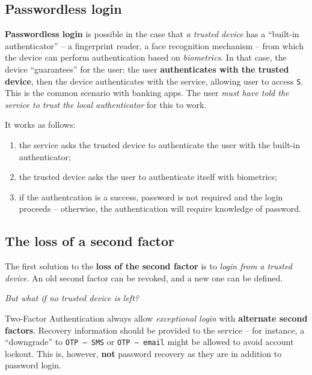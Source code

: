 \documentclass[10pt]{extbook}
\begin{document}
\subsection{Passwordless login}

\textbf{Passwordless login} is possible in the case that \emph{a trusted
device} has a ``built\--in authenticator'' -- a fingerprint reader, a face
recognition mechanism -- from which the device can perform authentication based
on \emph{biometrics}. In that case, the device ``guarantees'' for the user: the
user \textbf{authenticates with the trusted device}, then the device
authenticates with the service, allowing user to access \texttt{S}. This is the
common scenario with banking apps. The user \emph{must have told the service to
trust the local authenticator} for this to work.

It works as follows:
\begin{enumerate}
    \item the service asks the trusted device to authenticate the user with the
        built\--in authenticator;
    \item the trusted device asks the user to authenticate itself with
        biometrics;
    \item if the authentcation is a success, password is not required and the
        login proceeds -- otherwise, the authentication will require knowledge
        of password.
\end{enumerate}

\subsection{The loss of a second factor}

The first solution to the \textbf{loss of the second factor} is to \emph{login
from a trusted device}. An old second factor can be revoked, and a new one can
be defined. 

\vspace*{1cm}\begin{center}\emph{But what if no trusted device is left?}\end{center}\vspace*{1cm}

Two\--Factor Authentication always allow \emph{exceptional login} with
\textbf{alternate second factors}. Recovery information should be provided to
the service -- for instance, a ``downgrade'' to \texttt{OTP -- SMS} or
\texttt{OTP -- email} might be allowed to avoid account lockout. This is,
however, \textbf{not} password recovery as they are in addition to password
login.
\end{document}
